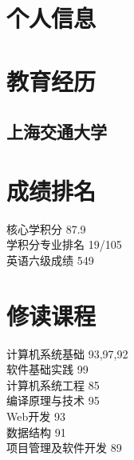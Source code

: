 \documentclass[]{deedy-resume-openfont}
\begin{document}
%
%
\lastupdated

%
%

%
%

\begin{minipage}[t]{0.25\textwidth} 

\section{个人信息}
\sectionsep
{}
\sectionsep

\section{教育经历} 
\sectionsep

\subsection{上海交通大学}
\sectionsep
\section{成绩排名}
\sectionsep
核心学积分 87.9  \\
学积分专业排名  19/105 \\
英语六级成绩  549
\sectionsep


\section{修读课程}
\sectionsep
计算机系统基础 93,97,92 \\
软件基础实践 99\\
计算机系统工程 85 \\
编译原理与技术 95 \\
Web开发 93 \\
数据结构 91 \\
项目管理及软件开发 89 \\
 \sectionsep
 \sectionsep


\end{minipage}
\end{document}
